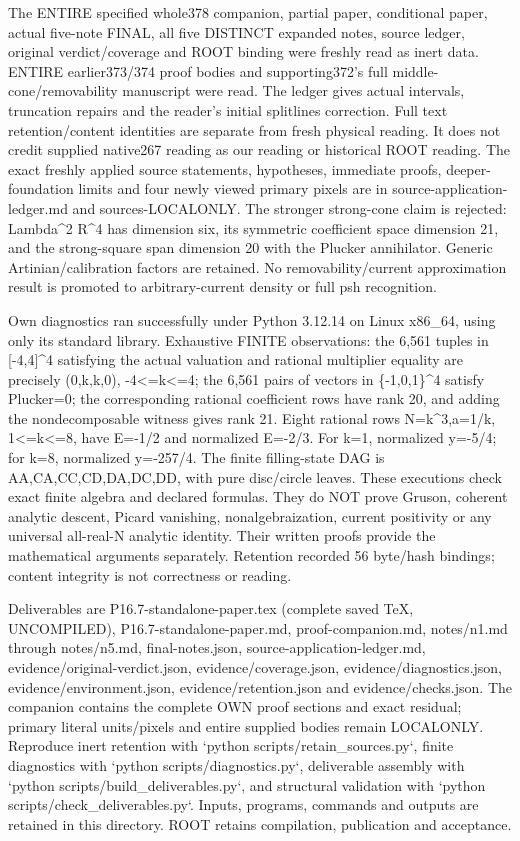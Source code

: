 \documentclass[11pt]{article}
\begin{document}
The ENTIRE specified whole378 companion, partial paper, conditional paper, actual five-note FINAL, all five DISTINCT expanded notes, source ledger, original verdict/coverage and ROOT binding were freshly read as inert data. ENTIRE earlier373/374 proof bodies and supporting372's full middle-cone/removability manuscript were read. The ledger gives actual intervals, truncation repairs and the reader's initial splitlines correction. Full text retention/content identities are separate from fresh physical reading. It does not credit supplied native267 reading as our reading or historical ROOT reading. The exact freshly applied source statements, hypotheses, immediate proofs, deeper-foundation limits and four newly viewed primary pixels are in source-application-ledger.md and sources-LOCALONLY. The stronger strong-cone claim is rejected: Lambda\textasciicircum{}2 R\textasciicircum{}4 has dimension six, its symmetric coefficient space dimension 21, and the strong-square span dimension 20 with the Plucker annihilator. Generic Artinian/calibration factors are retained. No removability/current approximation result is promoted to arbitrary-current density or full psh recognition.

Own diagnostics ran successfully under Python 3.12.14 on Linux x86\_64, using only its standard library. Exhaustive FINITE observations: the 6,561 tuples in [-4,4]\textasciicircum{}4 satisfying the actual valuation and rational multiplier equality are precisely (0,k,k,0), -4<=k<=4; the 6,561 pairs of vectors in \{-1,0,1\}\textasciicircum{}4 satisfy Plucker=0; the corresponding rational coefficient rows have rank 20, and adding the nondecomposable witness gives rank 21. Eight rational rows N=k\textasciicircum{}3,a=1/k, 1<=k<=8, have E=-1/2 and normalized E=-2/3. For k=1, normalized y=-5/4; for k=8, normalized y=-257/4. The finite filling-state DAG is AA,CA,CC,CD,DA,DC,DD, with pure disc/circle leaves. These executions check exact finite algebra and declared formulas. They do NOT prove Gruson, coherent analytic descent, Picard vanishing, nonalgebraization, current positivity or any universal all-real-N analytic identity. Their written proofs provide the mathematical arguments separately. Retention recorded 56 byte/hash bindings; content integrity is not correctness or reading.

Deliverables are P16.7-standalone-paper.tex (complete saved TeX, UNCOMPILED), P16.7-standalone-paper.md, proof-companion.md, notes/n1.md through notes/n5.md, final-notes.json, source-application-ledger.md, evidence/original-verdict.json, evidence/coverage.json, evidence/diagnostics.json, evidence/environment.json, evidence/retention.json and evidence/checks.json. The companion contains the complete OWN proof sections and exact residual; primary literal units/pixels and entire supplied bodies remain LOCALONLY. Reproduce inert retention with `python scripts/retain\_sources.py`, finite diagnostics with `python scripts/diagnostics.py`, deliverable assembly with `python scripts/build\_deliverables.py`, and structural validation with `python scripts/check\_deliverables.py`. Inputs, programs, commands and outputs are retained in this directory. ROOT retains compilation, publication and acceptance.
\end{document}
